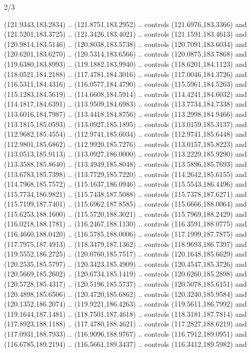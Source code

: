 \begin{flagdescription}{2/3}
\begin{scope}[shift={(0.5\flaglength,0.5)},scale=\flagwidth/320]
\begin{scope}[y=0.8pt, x=0.8pt, yscale=-1,shift={(-118.3,-146)}]
  (121.9343,183.2834) .. (121.8751,183.2952) .. controls (121.6976,183.3366) and
  (121.5201,183.3725) .. (121.3426,183.4021) .. controls (121.1591,183.4613) and
  (120.9814,183.5146) .. (120.8038,183.5738) .. controls (120.7091,183.6034) and
  (120.6201,183.6270) .. (120.5314,183.6566) .. controls (120.0875,183.7868) and
  (119.6380,183.8993) .. (119.1882,183.9940) .. controls (118.6201,184.1123) and
  (118.0521,184.2188) .. (117.4781,184.3016) .. controls (117.0046,184.3726) and
  (116.5311,184.4316) .. (116.0577,184.4790) .. controls (115.5961,184.5263) and
  (115.1283,184.5619) .. (114.6608,184.5914) .. controls (114.4241,184.6032) and
  (114.1817,184.6391) .. (113.9509,184.6983) .. controls (113.7734,184.7338) and
  (113.6016,184.7987) .. (113.4418,184.8756) .. controls (113.2998,184.9466) and
  (113.1815,185.0593) .. (113.0927,185.1895) .. controls (113.0159,185.3137) and
  (112.9682,185.4554) .. (112.9741,185.6034) .. controls (112.9741,185.6448) and
  (112.9801,185.6862) .. (112.9920,185.7276) .. controls (113.0157,185.8223) and
  (113.0513,185.9113) .. (113.0927,186.0000) .. controls (113.2229,185.9290) and
  (113.3588,185.8640) .. (113.4949,185.8048) .. controls (113.5896,185.7693) and
  (113.6783,185.7398) .. (113.7729,185.7220) .. controls (114.2642,185.6155) and
  (114.7968,185.7572) .. (115.1637,186.0946) .. controls (115.5543,186.4496) and
  (115.7734,186.9821) .. (115.7438,187.5088) .. controls (115.7378,187.6271) and
  (115.7199,187.7401) .. (115.6962,187.8585) .. controls (115.6666,188.0064) and
  (115.6253,188.1600) .. (115.5720,188.3021) .. controls (115.7969,188.2429) and
  (116.0218,188.1781) .. (116.2467,188.1130) .. controls (116.3591,188.0775) and
  (116.4660,188.0420) .. (116.5785,188.0006) .. controls (117.1999,187.7875) and
  (117.7975,187.4913) .. (118.3479,187.1362) .. controls (118.9693,186.7397) and
  (119.5552,186.2725) .. (120.0760,185.7517) .. controls (120.1648,185.6629) and
  (120.2535,185.5797) .. (120.3423,185.4909) .. controls (120.4547,185.3726) and
  (120.5669,185.2602) .. (120.6734,185.1419) .. controls (120.6260,185.2898) and
  (120.5728,185.4317) .. (120.5196,185.5737) .. controls (120.5078,185.6151) and
  (120.4898,185.6506) .. (120.4720,185.6862) .. controls (120.3240,185.9584) and
  (120.1352,186.2074) .. (119.9221,186.4263) .. controls (119.5611,186.7992) and
  (119.1644,187.1481) .. (118.7501,187.4618) .. controls (118.3181,187.7814) and
  (117.8923,188.1188) .. (117.4780,188.4621) .. controls (117.2827,188.6219) and
  (117.0931,188.7933) .. (116.9096,188.9767) .. controls (116.7912,189.0951) and
  (116.6785,189.2194) .. (116.5661,189.3437) .. controls (116.3412,189.5982) and

\end{scope}
\end{scope}
\end{flagdescription}
